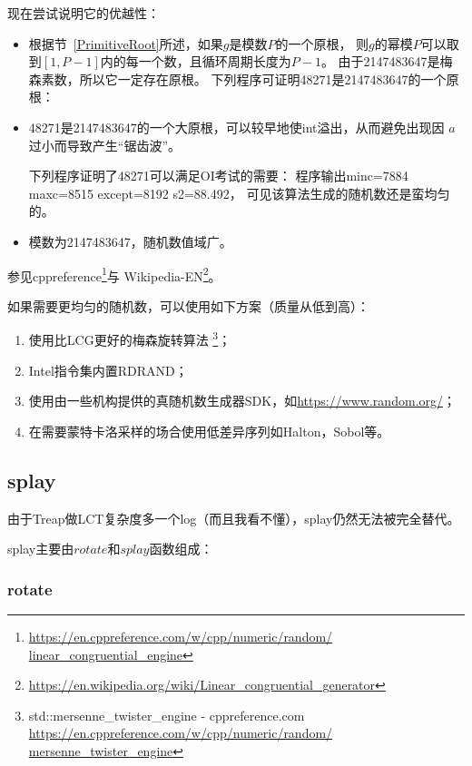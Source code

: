 现在尝试说明它的优越性：

\begin{itemize}
	\item 根据节~\ref{PrimitiveRoot}所述，如果$g$是模数$P$的一个原根，
	      则$g$的幂模$P$可以取到$[1,P-1]$内的每一个数，且循环周期长度为$P-1$。
	      由于2147483647是梅森素数，所以它一定存在原根。
	      下列程序可证明48271是2147483647的一个原根：
	      
	\item 48271是2147483647的一个大原根，可以较早地使int溢出，从而避免出现因
	      $a$过小而导致产生``锯齿波''。

          下列程序证明了48271可以满足OI考试的需要：
          程序输出minc=7884 maxc=8515 except=8192 s2=88.492，
          可见该算法生成的随机数还是蛮均匀的。
    \item 模数为2147483647，随机数值域广。
\end{itemize}

参见cppreference\footnote{
	\url{https://en.cppreference.com/w/cpp/numeric/random/
		linear\_congruential\_engine}}与
Wikipedia-EN\footnote{
	\url{https://en.wikipedia.org/wiki/Linear\_congruential\_generator}}。

如果需要更均匀的随机数，可以使用如下方案（质量从低到高）：
\begin{enumerate}
	\item 使用比LCG更好的梅森旋转算法
	      \footnote{std::mersenne\_twister\_engine - cppreference.com
		      \url{https://en.cppreference.com/w/cpp/numeric/random/
			      mersenne\_twister\_engine}}；
	\item Intel指令集内置RDRAND；
	\item 使用由一些机构提供的真随机数生成器SDK，如\url{https://www.random.org/}；
	\item 在需要蒙特卡洛采样的场合使用低差异序列如Halton，Sobol等。
\end{enumerate}

\subsection{splay}\label{splay}

由于Treap做LCT复杂度多一个log（而且我看不懂），splay仍然无法被完全替代。

splay主要由$rotate$和$splay$函数组成：

\subsubsection{rotate}

